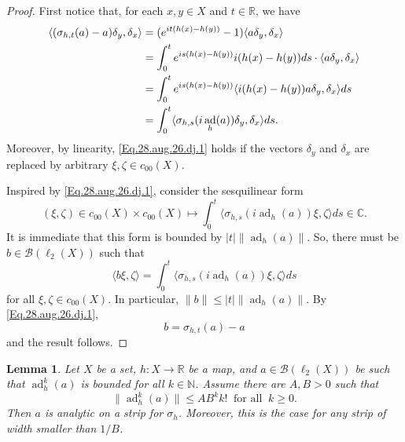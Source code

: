 \documentclass[11pt]{amsart}
\newcommand{\R}{\mathbb{R}}
\newcommand{\N}{\mathbb{N}}
\newcommand{\C}{\mathbb{C}}
\newcommand{\cB}{\mathcal{B}}
\numberwithin{equation}{section}
\newtheorem{lemma}[theorem]{Lemma}
\theoremstyle{definition}
\theoremstyle{remark}
\DeclareMathOperator{\ad}{ad}
\begin{document}
\begin{proof}
First notice that, for each $x,y\in X$ and $t\in\R$, we have
\begin{align}\label{Eq.28.aug.26.dj.1}
 \langle (\sigma_{h,t}(a)-a)\delta_y,\delta_x\rangle &=(e^{it(h(x)-h(y))}-1)\langle a\delta_y,\delta_x\rangle\\
 &=\int_0^te^{is(h(x)-h(y))} i(h(x)-h(y)) ds\cdot\langle a\delta_y,\delta_x\rangle\notag\\
 &=\int_0^te^{is(h(x)-h(y))} \langle  i(h(x)-h(y))a\delta_y,\delta_x\rangle ds
 \notag\\
 &=\int_0^t\langle \sigma_{h,s}(i\ad_h(a))\delta_y,\delta_x\rangle ds.\notag
\end{align}
Moreover, by linearity, \eqref{Eq.28.aug.26.dj.1} holds if the vectors $\delta_y$ and $\delta_x$ are replaced by  arbitrary $\xi,\zeta\in c_{00}(X)$.


Inspired by \eqref{Eq.28.aug.26.dj.1}, consider  the sesquilinear form
\[(\xi,\zeta)\in c_{00}(X)\times c_{00}(X)\mapsto \int_0^t\langle \sigma_{h,s}(i\ad_h(a))\xi,\zeta\rangle ds\in \C.\]
It is immediate that this form is bounded  by $|t|\|\ad_h(a)\|$. So, there must be  $b\in \cB(\ell_2(X))$ such that
\[\langle b\xi,\zeta\rangle=\int_0^t\langle \sigma_{h,s}(i\ad_h(a))\xi,\zeta\rangle ds\]
for all $\xi,\zeta\in c_{00}(X)$. In particular, $\|b\|\leq|t|\|\ad_h(a)\|$. By \eqref{Eq.28.aug.26.dj.1},  \[b=\sigma_{h,t}(a)-a\] and the result follows.
\end{proof}



\begin{lemma}\label{Lemma.BandFromMoments}
Let $X$ be a set,  $h\colon X\to\R$ be a map, and  $a\in\cB(\ell_2(X))$ be such that $\ad_h^k(a)$ is bounded for all $k\in\N$. Assume      there are $A,B>0$ such that
\[\|\ad_h^k(a)\|\leq AB^kk!\ \text{ for all }\ k\geq0.\]
Then $a$ is analytic on  a strip for $\sigma_h$. Moreover,  this is the case for   any strip of width smaller than $ 1/B$.
\end{lemma}
\end{document}
